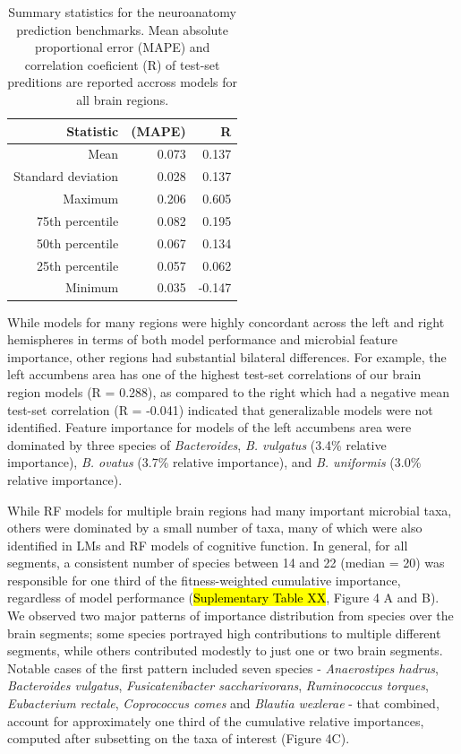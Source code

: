 \documentclass{article}
\begin{document}
\begin{table}[!h]
    \begin{center}
    \begin{tabular}{|r|r|r|}
      \hline\hline
      \textbf{Statistic} & \textbf{(MAPE)} & \textbf{R} \\\hline
      Mean & 0.073 & 0.137 \\
      Standard deviation & 0.028 & 0.137 \\
      Maximum & 0.206 & 0.605 \\
      75th percentile & 0.082 & 0.195 \\
      50th percentile & 0.067 & 0.134 \\
      25th percentile & 0.057 & 0.062 \\
      Minimum & 0.035 & -0.147 \\\hline\hline
    \end{tabular}
    \caption{\label{tab:neuro}Summary statistics for the neuroanatomy prediction benchmarks.
    Mean absolute proportional error (MAPE) and correlation coeficient (R)
    of test-set preditions are reported accross models for all brain regions.}
    \end{center}
\end{table}

While models for many regions were highly concordant across the
left and right hemispheres in terms of both model performance and
microbial feature importance, other regions had substantial
bilateral differences. For example, the left accumbens area
has one of the highest test-set correlations of our
brain region models (R = 0.288), as compared to the right which
had a negative mean test-set correlation (R = -0.041)
indicated that generalizable models were not identified.
Feature importance for models of the left accumbens area were dominated
by three species of \emph{Bacteroides}, \emph{B. vulgatus} (3.4\%
relative importance), \emph{B. ovatus} (3.7\% relative importance), and
\emph{B. uniformis} (3.0\% relative importance).

While RF models for multiple brain regions had many important microbial taxa, others were
dominated by a small number of taxa, many of which
were also identified in LMs and RF models of cognitive function. 
In general, for all segments, a
consistent number of species between 14 and 22 (median = 20) was
responsible for one third of the fitness-weighted cumulative importance,
regardless of model performance (\hl{Suplementary Table XX}, Figure 4 A and B).
We observed two major patterns of importance distribution from
species over the brain segments; some species portrayed high contributions
to multiple different segments, while others contributed modestly to
just one or two brain segments. Notable cases of the first pattern
included seven species - \emph{Anaerostipes hadrus}, \emph{Bacteroides
vulgatus}, \emph{Fusicatenibacter saccharivorans}, \emph{Ruminococcus
torques}, \emph{Eubacterium rectale}, \emph{Coprococcus comes} and
\emph{Blautia wexlerae} - that combined, account for approximately one
third of the cumulative relative importances, computed after subsetting
on the taxa of interest (Figure 4C).
\end{document}
